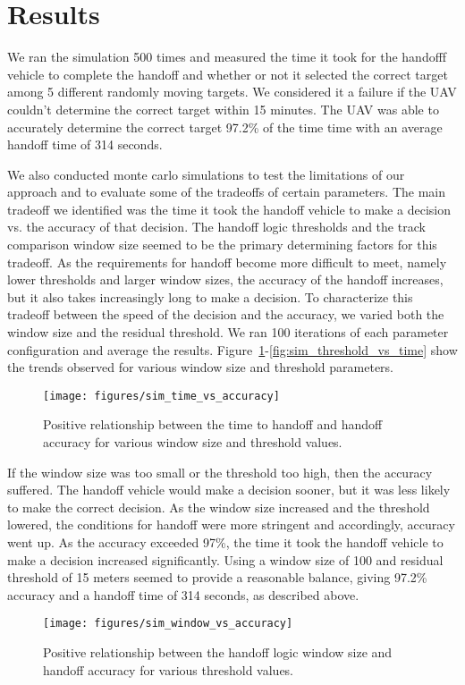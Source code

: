 \section{Results}
We ran the simulation 500 times and measured the time it took for the handofff vehicle to complete the handoff and whether or not it selected the correct target among 5 different randomly moving targets. We considered it a failure if the UAV couldn't determine the correct target within 15 minutes. The UAV was able to accurately determine the correct target 97.2\% of the time time with an average handoff time of 314 seconds.

We also conducted monte carlo simulations to test the limitations of our approach and to evaluate some of the tradeoffs of certain parameters. The main tradeoff we identified was the time it took the handoff vehicle to make a decision vs. the accuracy of that decision. The handoff logic thresholds and the track comparison window size seemed to be the primary determining factors for this tradeoff. As the requirements for handoff become more difficult to meet, namely lower thresholds and larger window sizes, the accuracy of the handoff increases, but it also takes increasingly long to make a decision. To characterize this tradeoff between the speed of the decision and the accuracy, we varied both the window size and the residual threshold. We ran 100 iterations of each parameter configuration and average the results. Figure~\ref{fig:sim_time_vs_accuracy}-\ref{fig:sim_threshold_vs_time} show the trends observed for various window size and threshold parameters.

\begin{figure}[hbt]
  \centering
  \texttt{[image: figures/sim\_time\_vs\_accuracy]}
  \caption{Positive relationship between the time to handoff and handoff accuracy for various window size and threshold values. }
  \label{fig:sim_time_vs_accuracy}
\end{figure}

If the window size was too small or the threshold too high, then the accuracy suffered. The handoff vehicle would make a decision sooner, but it was less likely  to make the correct decision. As the window size increased and the threshold lowered, the conditions for handoff were more stringent and accordingly, accuracy went up. As the accuracy exceeded 97\%, the time it took the handoff vehicle to make a decision increased significantly. Using a window size of 100 and residual threshold of 15 meters seemed to provide a reasonable balance, giving 97.2\% accuracy and a handoff time of 314 seconds, as described above.
\begin{figure}[hbt]
  \centering
  \texttt{[image: figures/sim\_window\_vs\_accuracy]}
  \caption{Positive relationship between the handoff logic window size and handoff accuracy for various threshold values.}
  \label{fig:sim_window_vs_accuracy}
\end{figure}

